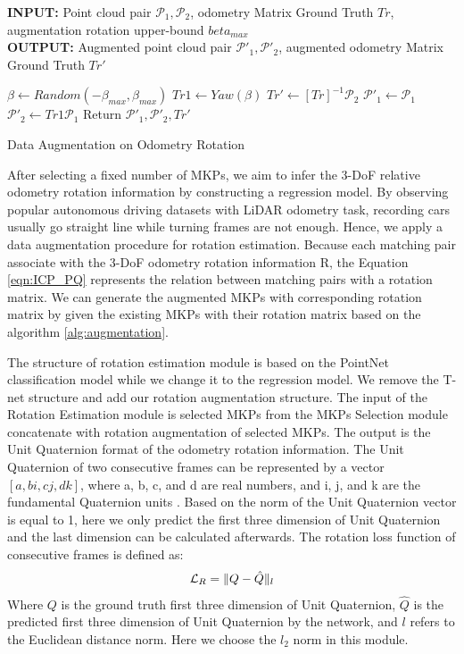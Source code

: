 \documentclass[sigconf]{acmart}
\providecommand{\SetAlgoLined}{\SetLine}
\begin{document}
\begin{algorithm}[t]\footnotesize

	\SetAlgoLined
	\begin{flushleft}
    \textbf{INPUT:} Point cloud pair $\mathcal{P}_1,\mathcal{P}_2$, odometry Matrix Ground Truth $Tr$, augmentation rotation upper-bound $beta_{max}$ \\
	\textbf{OUTPUT:} Augmented point cloud pair $\mathcal{P}'_1,\mathcal{P}'_2$, augmented odometry Matrix Ground Truth $Tr'$ \\ 
	\end{flushleft}
    \begin{algorithmic}
    \State$\beta \leftarrow Random(-\beta_{max},\beta_{max})$
    \State$Tr1 \leftarrow Yaw(\beta)$
    \State$Tr' \leftarrow [Tr]^{-1}\mathcal{P}_2$
    \State$\mathcal{P}'_1 \leftarrow \mathcal{P}_1$
    \State$\mathcal{P}'_2 \leftarrow Tr1 \mathcal{P}_1$
    \State Return $\mathcal{P}'_1,\mathcal{P}'_2,Tr'$
    \end{algorithmic}
	\caption{\footnotesize Data Augmentation on Odometry Rotation}\label{alg:augmentation}
\end{algorithm}

After selecting a fixed number of MKPs, we aim to infer the 3-DoF relative odometry rotation information by constructing a regression model. By observing popular autonomous driving datasets with LiDAR odometry task, recording cars usually go straight line while turning frames are not enough. Hence, we apply a data augmentation procedure for rotation estimation. Because each matching pair associate with the 3-DoF odometry rotation information R, the Equation \ref{eqn:ICP_PQ} represents the relation between matching pairs with a rotation matrix. We can generate the augmented MKPs with corresponding rotation matrix by given the existing MKPs with their rotation matrix based on the algorithm \ref{alg:augmentation}.

The structure of rotation estimation module is based on the PointNet classification model while we change it to the regression model. We remove the T-net structure and add our rotation augmentation structure. The input of the Rotation Estimation module is selected MKPs from the MKPs Selection module concatenate with rotation augmentation of selected MKPs. The output is the Unit Quaternion format of the odometry rotation information. The Unit Quaternion of two consecutive frames can be represented by a vector $[a, bi, cj, dk]$, where a, b, c, and d are real numbers, and i, j, and k are the fundamental Quaternion units \cite{Quaternion}. Based on the norm of the Unit Quaternion vector is equal to 1, here we only predict the first three dimension of Unit Quaternion and the last dimension can be calculated afterwards. 
The rotation loss function of consecutive frames is defined as: 
\begin{align}
\small
    \mathcal{L}_R =\|  Q - \hat{Q} \|_l 
\end{align}
Where $Q$ is the ground truth first three dimension of Unit Quaternion, $\hat{Q}$ is the predicted first three dimension of Unit Quaternion by the network, and $l$ refers to the Euclidean distance norm. Here we choose the $l_2$ norm in this module. 
\end{document}
